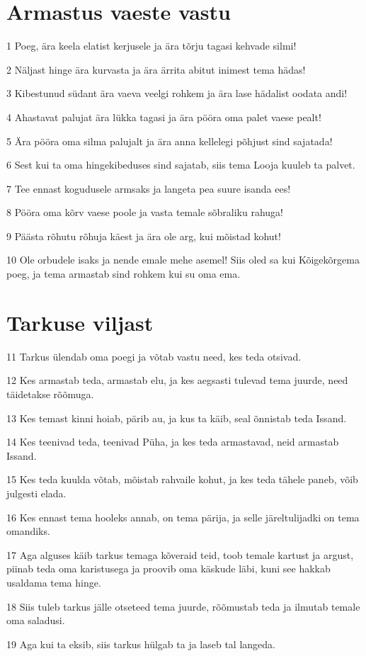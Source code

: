 \section*{Armastus vaeste vastu}

\par 1 Poeg, ära keela elatist kerjusele ja ära tõrju tagasi kehvade silmi!
\par 2 Näljast hinge ära kurvasta ja ära ärrita abitut inimest tema hädas!
\par 3 Kibestunud südant ära vaeva veelgi rohkem ja ära lase hädalist oodata andi!
\par 4 Ahastavat palujat ära lükka tagasi ja ära pööra oma palet vaese pealt!
\par 5 Ära pööra oma silma palujalt ja ära anna kellelegi põhjust sind sajatada!
\par 6 Sest kui ta oma hingekibeduses sind sajatab, siis tema Looja kuuleb ta palvet.
\par 7 Tee ennast kogudusele armsaks ja langeta pea suure isanda ees!
\par 8 Pööra oma kõrv vaese poole ja vasta temale sõbraliku rahuga!
\par 9 Päästa rõhutu rõhuja käest ja ära ole arg, kui mõistad kohut!
\par 10 Ole orbudele isaks ja nende emale mehe asemel! Siis oled sa kui Kõigekõrgema poeg, ja tema armastab sind rohkem kui su oma ema.

\section*{Tarkuse viljast}

\par 11 Tarkus ülendab oma poegi ja võtab vastu need, kes teda otsivad.
\par 12 Kes armastab teda, armastab elu, ja kes aegsasti tulevad tema juurde, need täidetakse rõõmuga.
\par 13 Kes temast kinni hoiab, pärib au, ja kus ta käib, seal õnnistab teda Issand.
\par 14 Kes teenivad teda, teenivad Püha, ja kes teda armastavad, neid armastab Issand.
\par 15 Kes teda kuulda võtab, mõistab rahvaile kohut, ja kes teda tähele paneb, võib julgesti elada.
\par 16 Kes ennast tema hooleks annab, on tema pärija, ja selle järeltulijadki on tema omandiks.
\par 17 Aga alguses käib tarkus temaga kõveraid teid, toob temale kartust ja argust, piinab teda oma karistusega ja proovib oma käskude läbi, kuni see hakkab usaldama tema hinge.
\par 18 Siis tuleb tarkus jälle otseteed tema juurde, rõõmustab teda ja ilmutab temale oma saladusi.
\par 19 Aga kui ta eksib, siis tarkus hülgab ta ja laseb tal langeda.

